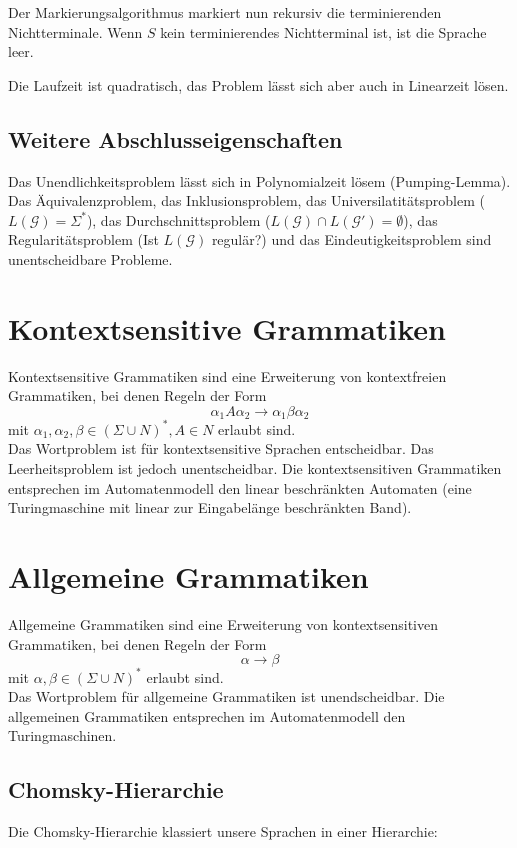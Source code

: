 \documentclass[11pt]{scrartcl}
\begin{document}
Der Markierungsalgorithmus markiert nun rekursiv die terminierenden Nichtterminale. Wenn $S$ kein terminierendes Nichtterminal ist, ist die Sprache leer.

Die Laufzeit ist quadratisch, das Problem lässt sich aber auch in Linearzeit lösen.

\subsection{Weitere Abschlusseigenschaften}
Das Unendlichkeitsproblem lässt sich in Polynomialzeit lösem (Pumping-Lemma). Das Äquivalenzproblem, das Inklusionsproblem, das Universilatitätsproblem ($L(\mathcal{G}) = \Sigma^*$), das Durchschnittsproblem ($L(\mathcal{G}) \cap L(\mathcal G') = \emptyset$), das Regularitätsproblem (Ist $L(\mathcal{G})$ regulär?) und das Eindeutigkeitsproblem sind unentscheidbare Probleme.

\section{Kontextsensitive Grammatiken}

Kontextsensitive Grammatiken sind eine Erweiterung von kontextfreien Grammatiken, bei denen Regeln der Form \[\alpha_1A\alpha_2 \to \alpha_1\beta\alpha_2\] mit $\alpha_1, \alpha_2, \beta \in (\Sigma \cup N)^\ast, A \in N$ erlaubt sind.\\

Das Wortproblem ist für kontextsensitive Sprachen entscheidbar. Das Leerheitsproblem ist jedoch unentscheidbar. Die kontextsensitiven Grammatiken entsprechen im Automatenmodell den linear beschränkten Automaten (eine Turingmaschine mit linear zur Eingabelänge beschränkten Band).

\section{Allgemeine Grammatiken}

Allgemeine Grammatiken sind eine Erweiterung von kontextsensitiven Grammatiken, bei denen Regeln der Form \[\alpha \to \beta\] mit $\alpha, \beta \in (\Sigma \cup N)^\ast$ erlaubt sind.\\

Das Wortproblem für allgemeine Grammatiken ist unendscheidbar. Die allgemeinen Grammatiken entsprechen im Automatenmodell den Turingmaschinen.

\subsection{Chomsky-Hierarchie}
Die Chomsky-Hierarchie klassiert unsere Sprachen in einer Hierarchie:
\end{document}
